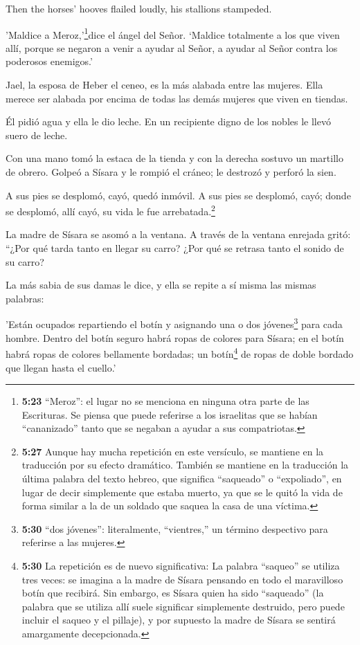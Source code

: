  Then the horses' hooves flailed loudly, his stallions
stampeded.

 'Maldice a Meroz,'\footnote{\textbf{5:23} ``Meroz'': el
  lugar no se menciona en ninguna otra parte de las Escrituras. Se
  piensa que puede referirse a los israelitas que se habían
  ``cananizado'' tanto que se negaban a ayudar a sus compatriotas.}dice
el ángel del Señor. `Maldice totalmente a los que viven allí, porque se
negaron a venir a ayudar al Señor, a ayudar al Señor contra los
poderosos enemigos.'

 Jael, la esposa de Heber el ceneo, es la más alabada entre
las mujeres. Ella merece ser alabada por encima de todas las demás
mujeres que viven en tiendas.

 Él pidió agua y ella le dio leche. En un recipiente digno
de los nobles le llevó suero de leche.

 Con una mano tomó la estaca de la tienda y con la derecha
sostuvo un martillo de obrero. Golpeó a Sísara y le rompió el cráneo; le
destrozó y perforó la sien.

 A sus pies se desplomó, cayó, quedó inmóvil. A sus pies se
desplomó, cayó; donde se desplomó, allí cayó, su vida le fue
arrebatada.\footnote{\textbf{5:27} Aunque hay mucha repetición en este
  versículo, se mantiene en la traducción por su efecto dramático.
  También se mantiene en la traducción la última palabra del texto
  hebreo, que significa ``saqueado'' o ``expoliado'', en lugar de decir
  simplemente que estaba muerto, ya que se le quitó la vida de forma
  similar a la de un soldado que saquea la casa de una víctima.}

 La madre de Sísara se asomó a la ventana. A través de la
ventana enrejada gritó: ``¿Por qué tarda tanto en llegar su carro? ¿Por
qué se retrasa tanto el sonido de su carro?

 La más sabia de sus damas le dice, y ella se repite a sí
misma las mismas palabras:

 'Están ocupados repartiendo el botín y asignando una o dos
jóvenes\footnote{\textbf{5:30} ``dos jóvenes'': literalmente,
  ``vientres,'' un término despectivo para referirse a las mujeres.}
para cada hombre. Dentro del botín seguro habrá ropas de colores para
Sísara; en el botín habrá ropas de colores bellamente bordadas; un
botín\footnote{\textbf{5:30} La repetición es de nuevo significativa: La
  palabra ``saqueo'' se utiliza tres veces: se imagina a la madre de
  Sísara pensando en todo el maravilloso botín que recibirá. Sin
  embargo, es Sísara quien ha sido ``saqueado'' (la palabra que se
  utiliza allí suele significar simplemente destruido, pero puede
  incluir el saqueo y el pillaje), y por supuesto la madre de Sísara se
  sentirá amargamente decepcionada.} de ropas de doble bordado que
llegan hasta el cuello.'

